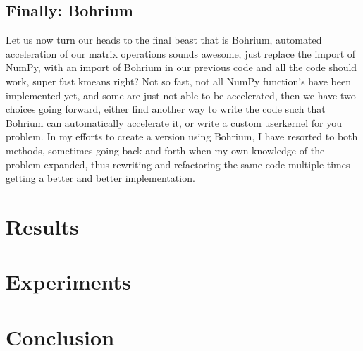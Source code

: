 \documentclass[12pt]{report}
\begin{document}
\newpage

\section{Finally: Bohrium}
\label{subsec:finally}
Let us now turn our heads to the final beast that is Bohrium, automated acceleration of our matrix operations sounds awesome, just replace the import of NumPy, with an import of Bohrium in our previous code and all the code should work, super fast kmeans right? Not so fast, not all NumPy function's have been implemented yet, and some are just not able to be accelerated, then we have two choices going forward, either find another way to write the code such that Bohrium can automatically accelerate it, or write a custom userkernel for you problem. In my efforts to create a version using Bohrium, I have resorted to both methods, sometimes going back and forth when my own knowledge of the problem expanded, thus rewriting and refactoring the same code multiple times getting a better and better implementation.


\chapter{Results}
\label{sec:label}




\chapter{Experiments}
\label{sec:experi}

\chapter{Conclusion}
\label{sec:label}



\newpage



\end{document}
